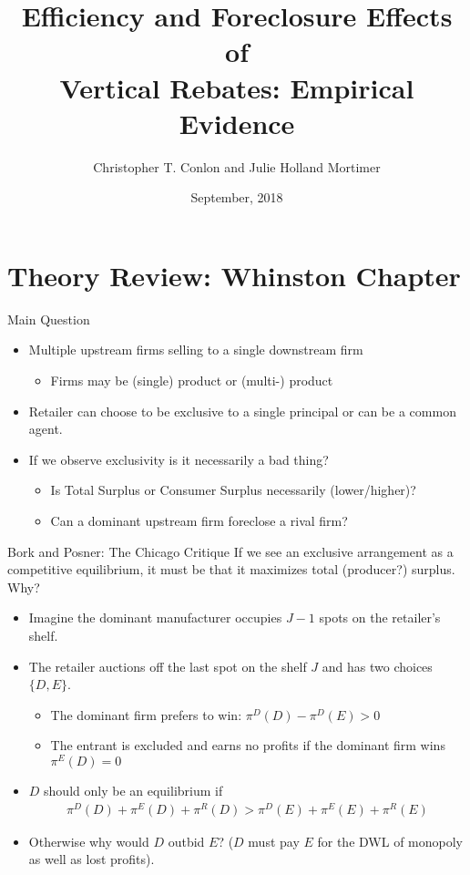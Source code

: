 \documentclass[aspectratio=169]{beamer}
\begin{document}
\title{Efficiency and Foreclosure Effects of \\ Vertical Rebates: Empirical Evidence}
\author{Christopher T. Conlon and Julie Holland Mortimer}
\date{September, 2018}

\frame{\titlepage}{
}


\section{Theory Review: Whinston Chapter}

\begin{frame}{Main Question}
\begin{itemize}
\item Multiple upstream firms selling to a single downstream firm
\begin{itemize}
\item Firms may be (single) product or (multi-) product
\end{itemize}
\item Retailer can choose to be \alert{exclusive} to a single principal or can be a \alert{common agent}.
\item If we observe \alert{exclusivity} is it necessarily a bad thing?
\begin{itemize}
\item Is Total Surplus or Consumer Surplus necessarily (lower/higher)?
\item Can a dominant upstream firm \alert{foreclose} a rival firm?
\end{itemize}
\end{itemize}
\end{frame}


\begin{frame}{Bork and Posner: The Chicago Critique}
If we see an exclusive arrangement as a competitive \alert{equilibrium}, it must be that it maximizes total (producer?) surplus. Why?
\begin{itemize}
\item Imagine the dominant manufacturer occupies $J-1$ spots on the retailer's shelf.
\item The retailer auctions off the last spot on the shelf $J$ and has two choices $\{D,E\}$.
\begin{itemize}
\item The dominant firm prefers to win: $\pi^D(D) -\pi^D(E) > 0$
\item The entrant is excluded and earns no profits if the dominant firm wins  $\pi^E(D)= 0$
\end{itemize}
\item $D$ should only be an equilibrium if
\begin{align*}
\pi^D(D) + \pi^E(D) + \pi^R(D) > \pi^D(E) + \pi^E(E) + \pi^R(E)
\end{align*}
\item Otherwise why would $D$ outbid $E$? ($D$ must pay $E$ for the DWL of monopoly as well as lost profits).
\end{itemize}
\end{frame}
\end{document}
